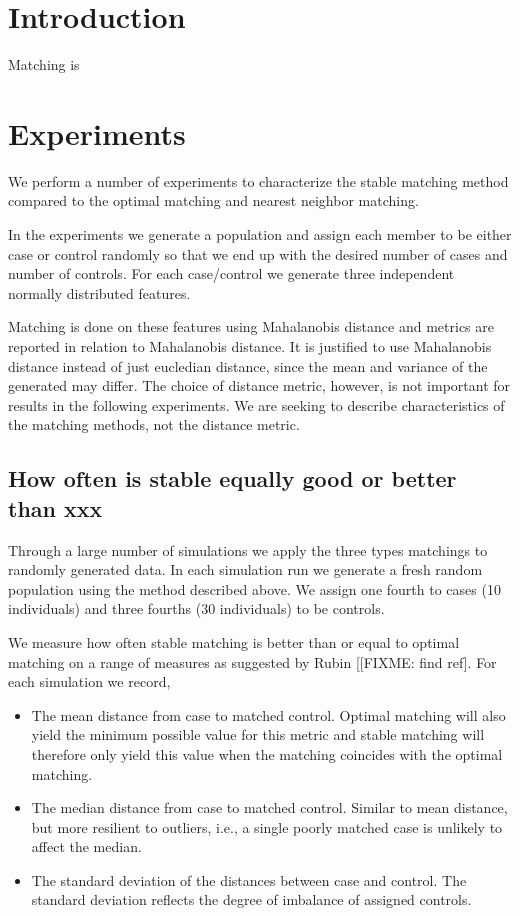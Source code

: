 \documentclass{article}
\begin{document}
\section{Introduction}

Matching is 

\section{Experiments}

We perform a number of experiments to characterize the stable matching method compared to the optimal matching and nearest neighbor matching.

In the experiments we generate a population and assign each member to be either case or control randomly so that we end up
with the desired number of cases and number of controls. For each case/control we generate three independent normally distributed features.

Matching is done on these features using Mahalanobis distance and metrics are reported in relation to Mahalanobis distance. 
It is justified to use Mahalanobis distance instead of just eucledian distance, since the mean and variance of the generated may differ.
The choice of distance metric, however, is not important for results in the following experiments. We are seeking to 
describe characteristics of the matching methods, not the distance metric.

\subsection{How often is stable equally good or better than xxx}

Through a large number of simulations we apply the three types matchings to randomly generated data.
In each simulation run we generate a fresh random population using the method described above. We 
assign one fourth to cases (10 individuals) and three fourths (30 individuals) to be controls. 

We measure how often stable matching is better than or equal to optimal matching on a range
of measures as suggested by Rubin [[FIXME: find ref].
For each simulation we record, 

\begin{itemize}
  \item The mean distance from case to matched control. Optimal matching will also yield the minimum possible value for this metric and stable matching will therefore only yield this value when the matching coincides with the optimal matching. 
  \item The median distance from case to matched control. Similar to mean distance, but more resilient to outliers, i.e., a single poorly matched case is unlikely to affect the median.
  \item The standard deviation of the distances between case and control. The standard deviation reflects the degree of imbalance of assigned controls.
\end{itemize}
\end{document}
